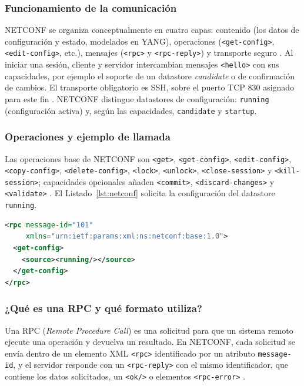 \subsubsection{Funcionamiento de la comunicación}
NETCONF se organiza conceptualmente en cuatro capas: contenido (los datos de configuración y estado, modelados en YANG), operaciones (\texttt{<get-config>}, \texttt{<edit-config>}, etc.), mensajes (\texttt{<rpc>} y \texttt{<rpc-reply>}) y transporte seguro \parencite{rfc6241}. Al iniciar una sesión, cliente y servidor intercambian mensajes \texttt{<hello>} con sus capacidades, por ejemplo el soporte de un datastore \textit{candidate} o de confirmación de cambios. El transporte obligatorio es SSH, sobre el puerto TCP 830 asignado para este fin \parencite{rfc6242}. NETCONF distingue datastores de configuración: \texttt{running} (configuración activa) y, según las capacidades, \texttt{candidate} y \texttt{startup}.

\subsubsection{Operaciones y ejemplo de llamada}
Las operaciones base de NETCONF son \texttt{<get>}, \texttt{<get-config>}, \texttt{<edit-config>}, \texttt{<copy-config>}, \texttt{<delete-config>}, \texttt{<lock>}, \texttt{<unlock>}, \texttt{<close-session>} y \texttt{<kill-session>}; capacidades opcionales añaden \texttt{<commit>}, \texttt{<discard-changes>} y \texttt{<validate>} \parencite{rfc6241}. El Listado~\ref{lst:netconf} solicita la configuración del datastore \texttt{running}.

\begin{lstlisting}[language=XML,caption={Ejemplo de solicitud NETCONF get-config},label={lst:netconf}]
<rpc message-id="101"
     xmlns="urn:ietf:params:xml:ns:netconf:base:1.0">
  <get-config>
    <source><running/></source>
  </get-config>
</rpc>
\end{lstlisting}

\subsubsection{¿Qué es una RPC y qué formato utiliza?}
Una RPC (\textit{Remote Procedure Call}) es una solicitud para que un sistema remoto ejecute una operación y devuelva un resultado. En NETCONF, cada solicitud se envía dentro de un elemento XML \texttt{<rpc>} identificado por un atributo \texttt{message-id}, y el servidor responde con un \texttt{<rpc-reply>} con el mismo identificador, que contiene los datos solicitados, un \texttt{<ok/>} o elementos \texttt{<rpc-error>} \parencite{rfc6241}.

